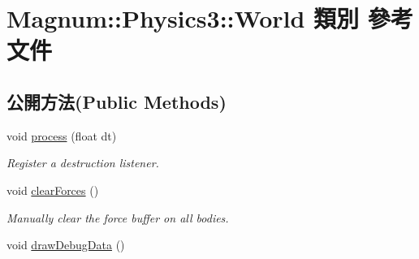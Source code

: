 \hypertarget{class_magnum_1_1_physics3_1_1_world}{}\section{Magnum\+:\+:Physics3\+:\+:World 類別 參考文件}
\label{class_magnum_1_1_physics3_1_1_world}
\subsection*{公開方法(Public Methods)}
\begin{DoxyCompactItemize}
\item 
void \hyperlink{class_magnum_1_1_physics3_1_1_world_a162a944743334f77ae2e34d9b843d93e}{process} (float dt)
\begin{DoxyCompactList}\small\item\em Register a destruction listener. \end{DoxyCompactList}\item 
void \hyperlink{class_magnum_1_1_physics3_1_1_world_ad23594074920bd2423ead71297ca7b48}{clear\+Forces} ()
\begin{DoxyCompactList}\small\item\em Manually clear the force buffer on all bodies. \end{DoxyCompactList}\item 
void \hyperlink{class_magnum_1_1_physics3_1_1_world_a5bdd90a3f4186d46f042a3c4e550fd67}{draw\+Debug\+Data} ()\hypertarget{class_magnum_1_1_physics3_1_1_world_a5bdd90a3f4186d46f042a3c4e550fd67}{}\label{class_magnum_1_1_physics3_1_1_world_a5bdd90a3f4186d46f042a3c4e550fd67}


\end{DoxyCompactItemize}
